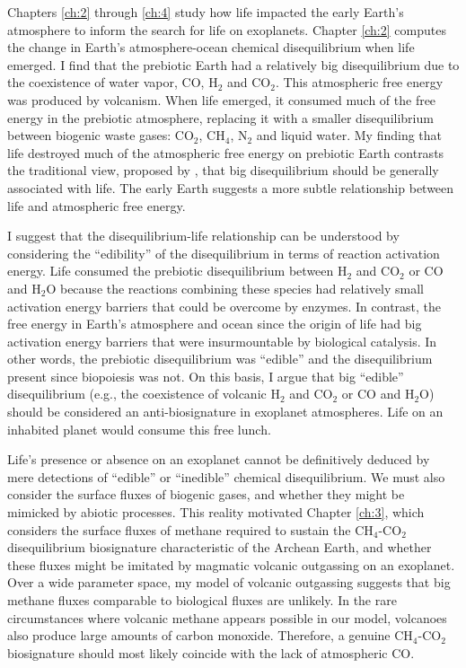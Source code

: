 Chapters \ref{ch:2} through \ref{ch:4} study how life impacted the early Earth's atmosphere to inform the search for life on exoplanets. Chapter \ref{ch:2} computes the change in Earth's atmosphere-ocean chemical disequilibrium when life emerged. I find that the prebiotic Earth had a relatively big disequilibrium due to the coexistence of water vapor, CO, H$_2$ and CO$_2$. This atmospheric free energy was produced by volcanism. When life emerged, it consumed much of the free energy in the prebiotic atmosphere, replacing it with a smaller disequilibrium between biogenic waste gases: CO$_2$, CH$_4$, N$_2$ and liquid water. My finding that life destroyed much of the atmospheric free energy on prebiotic Earth contrasts the traditional view, proposed by \citet{Lovelock_1965}, that big disequilibrium should be generally associated with life. The early Earth suggests a more subtle relationship between life and atmospheric free energy.

I suggest that the disequilibrium-life relationship can be understood by considering the ``edibility'' of the disequilibrium in terms of reaction activation energy. Life consumed the prebiotic disequilibrium between H$_2$ and CO$_2$ or CO and H$_2$O because the reactions combining these species had relatively small activation energy barriers that could be overcome by enzymes. In contrast, the free energy in Earth's atmosphere and ocean since the origin of life had big activation energy barriers that were insurmountable by biological catalysis. In other words, the prebiotic disequilibrium was ``edible'' and the disequilibrium present since biopoiesis was not. On this basis, I argue that big ``edible'' disequilibrium (e.g., the coexistence of volcanic H$_2$ and CO$_2$ or CO and H$_2$O) should be considered an anti-biosignature in exoplanet atmospheres. Life on an inhabited planet would consume this free lunch.

Life's presence or absence on an exoplanet cannot be definitively deduced by mere detections of ``edible'' or ``inedible'' chemical disequilibrium. We must also consider the surface fluxes of biogenic gases, and whether they might be mimicked by abiotic processes. This reality motivated Chapter \ref{ch:3}, which considers the surface fluxes of methane required to sustain the CH$_4$-CO$_2$ disequilibrium biosignature characteristic of the Archean Earth, and whether these fluxes might be imitated by magmatic volcanic outgassing on an exoplanet. Over a wide parameter space, my model of volcanic outgassing suggests that big methane fluxes comparable to biological fluxes are unlikely. In the rare circumstances where volcanic methane appears possible in our model, volcanoes also produce large amounts of carbon monoxide. Therefore, a genuine CH$_4$-CO$_2$ biosignature should most likely coincide with the lack of atmospheric CO.

